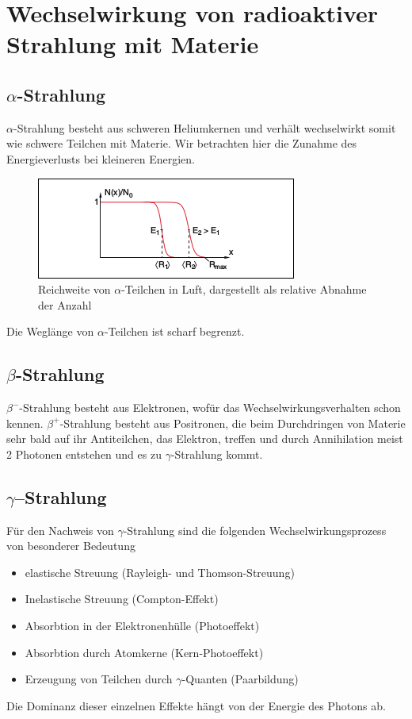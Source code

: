 \documentclass[Ex4_Zusammenfassung.tex]{subfiles}
\begin{document}
\section{Wechselwirkung von radioaktiver Strahlung mit Materie}
\subsection{$\alpha$-Strahlung}
$\alpha$-Strahlung besteht aus schweren Heliumkernen und verhält wechselwirkt somit wie schwere Teilchen mit Materie. Wir betrachten hier die Zunahme des Energieverlusts bei kleineren Energien.

\begin{figure}[H]
	\centering
	\includegraphics{alpha-Strahlung_Reichweite.png}
	\caption{Reichweite von $\alpha$-Teilchen in Luft, dargestellt als relative Abnahme der Anzahl}
\end{figure}

Die Weglänge von $\alpha$-Teilchen ist scharf begrenzt.

\subsection{$\beta$-Strahlung}
$\beta^-$-Strahlung besteht aus Elektronen, wofür das Wechselwirkungsverhalten schon kennen. \newline
$\beta^+$-Strahlung besteht aus Positronen, die beim Durchdringen von Materie sehr bald auf ihr Antiteilchen, das Elektron, treffen und durch Annihilation meist 2 Photonen entstehen und es zu $\gamma$-Strahlung kommt.

\subsection{$\gamma$--Strahlung}
Für den Nachweis von $\gamma$-Strahlung sind die folgenden Wechselwirkungsprozess von besonderer Bedeutung
\begin{itemize}
\item elastische Streuung (Rayleigh- und Thomson-Streuung)
\item Inelastische Streuung (Compton-Effekt)
\item Absorbtion in der Elektronenhülle (Photoeffekt)
\item Absorbtion durch Atomkerne (Kern-Photoeffekt)
\item Erzeugung von Teilchen durch $\gamma$-Quanten (Paarbildung)
\end{itemize}
Die Dominanz dieser einzelnen Effekte hängt von der Energie des Photons ab.
\end{document}
